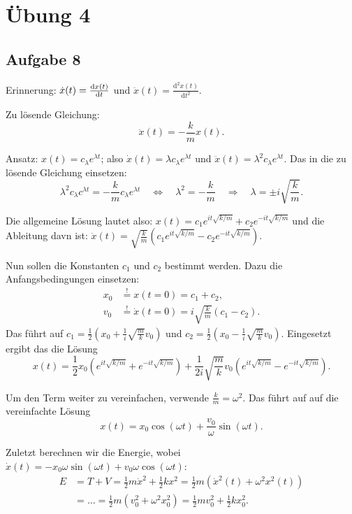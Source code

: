 \chapter*{Übung 4}

\section*{Aufgabe 8}

Erinnerung: $\dot{x}(t) = \frac{\mathrm{d}x(t)}{\mathrm{d}t}$ und $\ddot{x}(t) = \frac{\mathrm{d}^2 x(t)}{\mathrm{d} t^2}$.

Zu lösende Gleichung:
\[
	\ddot{x}(t) = -\frac{k}{m} x(t)
	\text{.}
\]

Ansatz: $x(t) = c_\lambda e^{\lambda t}$; also $\dot{x}(t) = \lambda c_\lambda e^{\lambda t}$ und $\ddot{x}(t) = \lambda^2 c_\lambda e^{\lambda t}$. Das in die zu lösende Gleichung einsetzen:
\[
	\lambda^2 c_\lambda c^{\lambda t} = -\frac{k}{m} c_\lambda e^{\lambda t}
	\quad \Longleftrightarrow \quad
	\lambda^2 = -\frac{k}{m}
	\quad \Longrightarrow \quad
	\lambda = \pm i \sqrt{\frac{k}{m}}
	\text{.}
\]

Die allgemeine Lösung lautet also: $x(t) = c_1 e^{it \sqrt{k / m}} + c_2 e^{-it \sqrt{k / m}}$ und die Ableitung davn ist: $\dot{x}(t) = \sqrt{\frac{k}{m}} \left( c_1 e^{it \sqrt{k / m}} - c_2 e^{-it \sqrt{k / m}} \right)$.

Nun sollen die Konstanten $c_1$ und $c_2$ bestimmt werden. Dazu die Anfangsbedingungen einsetzen:
\begin{align*}
	x_0 &\overset{!}{=} x(t = 0) = c_1 + c_2,	 \\
	v_0 &\overset{!}{=} \dot{x}(t = 0) = i \sqrt{\frac{k}{m}} (c_1 - c_2)
	\text{.}
\end{align*}
Das führt auf $c_1 = \frac{1}{2} \left( x_0 + \frac{1}{i} \sqrt{\frac{m}{k}} v_0 \right)$ und $c_2 = \frac{1}{2} \left( x_0 - \frac{1}{i} \sqrt{\frac{m}{k}} v_0 \right)$. Eingesetzt ergibt das die Lösung
\[
	x(t) = \frac{1}{2} x_0 \left( e^{it \sqrt{k / m}} + e^{-it \sqrt{k / m}} \right)
	+ \frac{1}{2i} \sqrt{\frac{m}{k}} v_0 \left( e^{it \sqrt{k / m}} - e^{-it \sqrt{k / m}} \right)
	\text{.}
\]

Um den Term weiter zu vereinfachen, verwende $\frac{k}{m} = \omega^2$. Das führt auf auf die vereinfachte Lösung
\[
	x(t) = x_0 \cos(\omega t) + \frac{v_0}{\omega} \sin(\omega t)
	\text{.}
\]

Zuletzt berechnen wir die Energie, wobei $\dot{x}(t) = -x_0 \omega \sin(\omega t) + v_0 \omega \cos(\omega t)$:
\begin{align*}
	E &= T + V = \frac{1}{2} m \dot{x}^2 + \frac{1}{2} k x^2	 = \frac{1}{2} m \left( \dot{x}^2(t) + \omega^2 x^2(t) \right) \\
	&= \dots = \frac{1}{2} m \left( v_0^2 + \omega^2 x_0^2 \right) = \frac{1}{2} m v_0^2 + \frac{1}{2} k x_0^2
	\text{.}
\end{align*}

